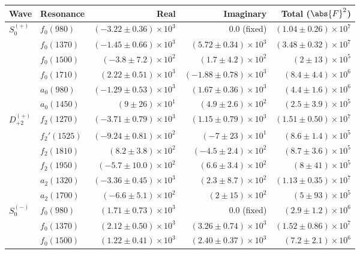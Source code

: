 \begin{table}[h]
    \begin{center}
        \begin{tabular}{llrrr}\toprule
        Wave & Resonance & Real & Imaginary & Total ($\abs{F}^2$) \\\midrule
$S_{0}^{(+)}$ & $f_{0}(980)$ & $(-3.22 \pm 0.36) \times 10^{3}$ & $0.0$ (fixed) & $(1.04 \pm 0.26) \times 10^{7}$ \\
 & $f_{0}(1370)$ & $(-1.45 \pm 0.66) \times 10^{3}$ & $(5.72 \pm 0.34) \times 10^{3}$ & $(3.48 \pm 0.32) \times 10^{7}$ \\
 & $f_{0}(1500)$ & $(-3.8 \pm 7.2) \times 10^{2}$ & $(1.7 \pm 4.2) \times 10^{2}$ & $(2 \pm 13) \times 10^{5}$ \\
 & $f_{0}(1710)$ & $(2.22 \pm 0.51) \times 10^{3}$ & $(-1.88 \pm 0.78) \times 10^{3}$ & $(8.4 \pm 4.4) \times 10^{6}$ \\
 & $a_{0}(980)$ & $(-1.29 \pm 0.53) \times 10^{3}$ & $(1.67 \pm 0.36) \times 10^{3}$ & $(4.4 \pm 1.6) \times 10^{6}$ \\
 & $a_{0}(1450)$ & $(9 \pm 26) \times 10^{1}$ & $(4.9 \pm 2.6) \times 10^{2}$ & $(2.5 \pm 3.9) \times 10^{5}$ \\
$D_{+2}^{(+)}$ & $f_{2}(1270)$ & $(-3.71 \pm 0.79) \times 10^{3}$ & $(1.15 \pm 0.79) \times 10^{3}$ & $(1.51 \pm 0.50) \times 10^{7}$ \\
 & $f_{2}'(1525)$ & $(-9.24 \pm 0.81) \times 10^{2}$ & $(-7 \pm 23) \times 10^{1}$ & $(8.6 \pm 1.4) \times 10^{5}$ \\
 & $f_{2}(1810)$ & $(8.2 \pm 3.8) \times 10^{2}$ & $(-4.5 \pm 2.4) \times 10^{2}$ & $(8.7 \pm 3.6) \times 10^{5}$ \\
 & $f_{2}(1950)$ & $(-5.7 \pm 10.0) \times 10^{2}$ & $(6.6 \pm 3.4) \times 10^{2}$ & $(8 \pm 41) \times 10^{5}$ \\
 & $a_{2}(1320)$ & $(-3.36 \pm 0.45) \times 10^{3}$ & $(2.3 \pm 8.7) \times 10^{2}$ & $(1.13 \pm 0.35) \times 10^{7}$ \\
 & $a_{2}(1700)$ & $(-6.6 \pm 5.1) \times 10^{2}$ & $(2 \pm 15) \times 10^{2}$ & $(5 \pm 93) \times 10^{5}$ \\
$S_{0}^{(-)}$ & $f_{0}(980)$ & $(1.71 \pm 0.73) \times 10^{3}$ & $0.0$ (fixed) & $(2.9 \pm 1.2) \times 10^{6}$ \\
 & $f_{0}(1370)$ & $(2.12 \pm 0.50) \times 10^{3}$ & $(3.26 \pm 0.74) \times 10^{3}$ & $(1.52 \pm 0.86) \times 10^{7}$ \\
 & $f_{0}(1500)$ & $(1.22 \pm 0.41) \times 10^{3}$ & $(2.40 \pm 0.37) \times 10^{3}$ & $(7.2 \pm 2.1) \times 10^{6}$ \\

\end{tabular}
\end{center}
\end{table}

